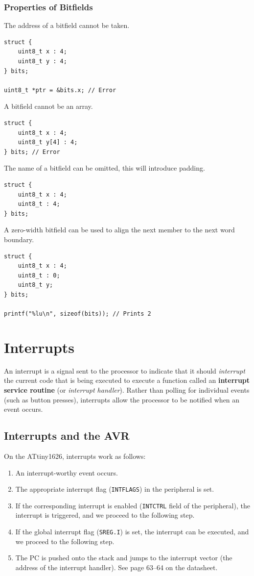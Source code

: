 \documentclass{report}
\begin{document}
\subsection{Properties of Bitfields}
The address of a bitfield cannot be taken.
\begin{verbatim}
struct {
    uint8_t x : 4;
    uint8_t y : 4;
} bits;

uint8_t *ptr = &bits.x; // Error
\end{verbatim}
A bitfield cannot be an array.
\begin{verbatim}
struct {
    uint8_t x : 4;
    uint8_t y[4] : 4;
} bits; // Error
\end{verbatim}
The name of a bitfield can be omitted, this will introduce padding.
\begin{verbatim}
struct {
    uint8_t x : 4;
    uint8_t : 4;
} bits;
\end{verbatim}
A zero-width bitfield can be used to align the next member
to the next word boundary.
\begin{verbatim}
struct {
    uint8_t x : 4;
    uint8_t : 0;
    uint8_t y;
} bits;

printf("%lu\n", sizeof(bits)); // Prints 2
\end{verbatim}
\chapter{Interrupts}
An interrupt is a signal sent to the processor to indicate that it should \textit{interrupt}
the current code that is being executed to execute a function called an \textbf{interrupt service routine} (or \textit{interrupt handler}).
Rather than polling for individual events (such as button presses), interrupts allow the processor to be notified when an event occurs.
\section{Interrupts and the AVR}
On the ATtiny1626, interrupts work as follows:
\begin{enumerate}
    \item An interrupt-worthy event occurs.
    \item The appropriate interrupt flag (\texttt{INTFLAGS}) in the peripheral is set.
    \item If the corresponding interrupt is enabled (\texttt{INTCTRL} field of the peripheral), the interrupt is triggered, and we proceed to the following step.
    \item If the global interrupt flag (\texttt{SREG.I}) is set, the interrupt can be executed, and we proceed to the following step.
    \item The PC is pushed onto the stack and jumps to the interrupt vector (the address of the interrupt handler).
          See page 63--64 on the datasheet.
\end{enumerate}
\end{document}
